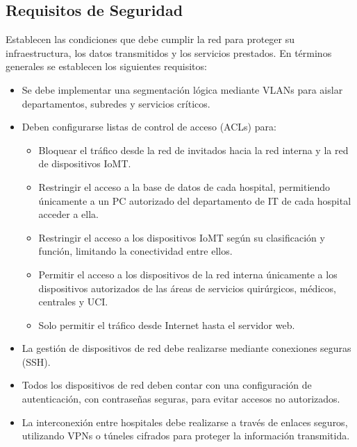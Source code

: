 \subsection{Requisitos de Seguridad}
\label{subsec: TiposIoMT}
Establecen las condiciones que debe cumplir la red para proteger su infraestructura, los datos transmitidos y los servicios prestados. En términos generales se establecen los siguientes requisitos:
\begin{itemize}
    \item Se debe implementar una segmentación lógica mediante VLANs para aislar departamentos, subredes y servicios críticos.
    \item Deben configurarse listas de control de acceso (ACLs) para:
    \begin{itemize}
        \item Bloquear el tráfico desde la red de invitados hacia la red interna y la red de dispositivos IoMT.
        \item Restringir el acceso a la base de datos de cada hospital, permitiendo únicamente a un PC autorizado del departamento de IT de cada hospital acceder a ella.
        \item Restringir el acceso a los dispositivos IoMT según su clasificación y función, limitando la conectividad entre ellos.
        \item Permitir el acceso a los dispositivos de la red interna únicamente a los dispositivos autorizados de las áreas de servicios quirúrgicos, médicos, centrales y UCI.
        \item Solo permitir el tráfico desde Internet hasta el servidor web.
    \end{itemize}
    \item La gestión de dispositivos de red debe realizarse mediante conexiones seguras (SSH).
    \item Todos los dispositivos de red deben contar con una configuración de autenticación, con contraseñas seguras, para evitar accesos no autorizados.
    \item La interconexión entre hospitales debe realizarse a través de enlaces seguros, utilizando VPNs o túneles cifrados para proteger la información transmitida.
\end{itemize}

